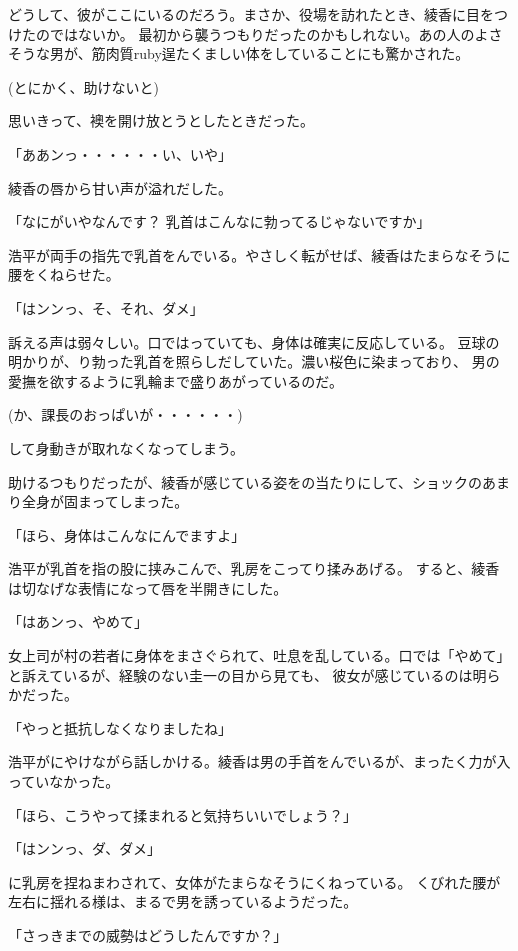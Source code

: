 ﻿\documentclass[book,tate]{jlreq}
\begin{document}
どうして、彼がここにいるのだろう。まさか、役場を訪れたとき、綾香に目をつけたのではないか。
最初から襲うつもりだったのかもしれない。あの人のよさそうな男が、筋肉質ruby{逞}{たくま}しい体をしていることにも驚かされた。

(とにかく、助けないと)

思いきって、襖を開け放とうとしたときだった。

「ああンっ・・・・・・い、いや」

綾香の唇から甘い声が溢れだした。

「なにがいやなんです？ 乳首はこんなに勃ってるじゃないですか」

浩平が両手の指先で乳首をんでいる。やさしく転がせば、綾香はたまらなそうに腰をくねらせた。

「はンンっ、そ、それ、ダメ」

訴える声は弱々しい。口ではっていても、身体は確実に反応している。
豆球の明かりが、り勃った乳首を照らしだしていた。濃い桜色に染まっており、
男の愛撫を欲するように乳輪まで盛りあがっているのだ。

(か、課長のおっぱいが・・・・・・)

して身動きが取れなくなってしまう。

助けるつもりだったが、綾香が感じている姿をの当たりにして、ショックのあまり全身が固まってしまった。

「ほら、身体はこんなにんでますよ」

浩平が乳首を指の股に挟みこんで、乳房をこってり揉みあげる。 すると、綾香は切なげな表情になって唇を半開きにした。

「はあンっ、やめて」

女上司が村の若者に身体をまさぐられて、吐息を乱している。口では「やめて」と訴えているが、経験のない圭一の目から見ても、
彼女が感じているのは明らかだった。

「やっと抵抗しなくなりましたね」

浩平がにやけながら話しかける。綾香は男の手首をんでいるが、まったく力が入っていなかった。

「ほら、こうやって揉まれると気持ちいいでしょう？」

「はンンっ、ダ、ダメ」

に乳房を捏ねまわされて、女体がたまらなそうにくねっている。
くびれた腰が左右に揺れる様は、まるで男を誘っているようだった。

「さっきまでの威勢はどうしたんですか？」
\end{document}
